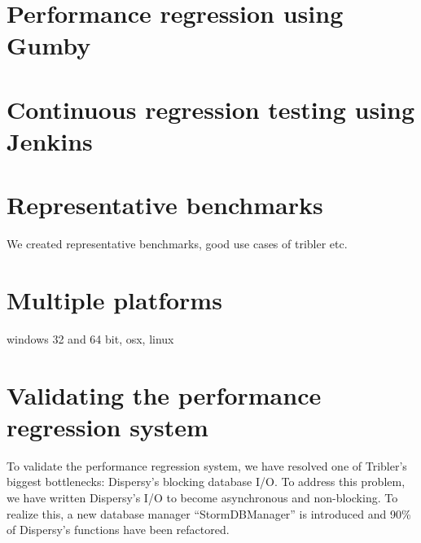 \section{Performance regression using Gumby}

\section{Continuous regression testing using Jenkins}


\section{Representative benchmarks}

We created representative benchmarks, good use cases of tribler etc.

\section{Multiple platforms}

windows 32 and 64 bit, osx, linux

\section{Validating the performance regression system}

To validate the performance regression system, we have resolved one of Tribler's biggest bottlenecks: Dispersy's blocking database I/O.
To address this problem, we have written Dispersy's I/O to become asynchronous and non-blocking.
To realize this, a new database manager \enquote{StormDBManager} is introduced and 90\% of Dispersy's functions have been refactored.